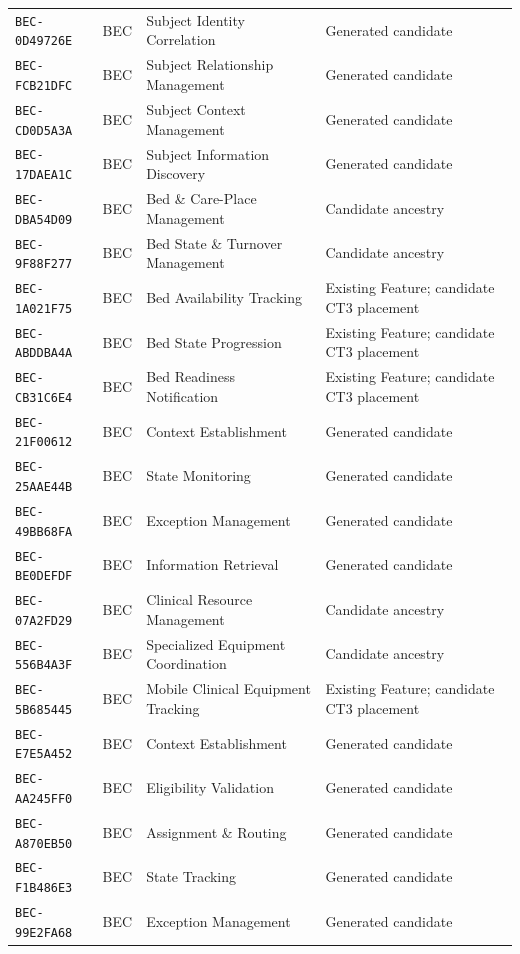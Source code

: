 \documentclass[11pt,a4paper,openany]{book}
\begin{document}
\begin{longtable}{@{}p{.19\linewidth}p{.12\linewidth}p{.39\linewidth}p{.24\linewidth}@{}}
\texttt{BEC-0D49726E} & BEC & Subject Identity Correlation & Generated candidate \\
\texttt{BEC-FCB21DFC} & BEC & Subject Relationship Management & Generated candidate \\
\texttt{BEC-CD0D5A3A} & BEC & Subject Context Management & Generated candidate \\
\texttt{BEC-17DAEA1C} & BEC & Subject Information Discovery & Generated candidate \\
\texttt{BEC-DBA54D09} & BEC & Bed \& Care-Place Management & Candidate ancestry \\
\texttt{BEC-9F88F277} & BEC & Bed State \& Turnover Management & Candidate ancestry \\
\texttt{BEC-1A021F75} & BEC & Bed Availability Tracking & Existing Feature; candidate CT3 placement \\
\texttt{BEC-ABDDBA4A} & BEC & Bed State Progression & Existing Feature; candidate CT3 placement \\
\texttt{BEC-CB31C6E4} & BEC & Bed Readiness Notification & Existing Feature; candidate CT3 placement \\
\texttt{BEC-21F00612} & BEC & Context Establishment & Generated candidate \\
\texttt{BEC-25AAE44B} & BEC & State Monitoring & Generated candidate \\
\texttt{BEC-49BB68FA} & BEC & Exception Management & Generated candidate \\
\texttt{BEC-BE0DEFDF} & BEC & Information Retrieval & Generated candidate \\
\texttt{BEC-07A2FD29} & BEC & Clinical Resource Management & Candidate ancestry \\
\texttt{BEC-556B4A3F} & BEC & Specialized Equipment Coordination & Candidate ancestry \\
\texttt{BEC-5B685445} & BEC & Mobile Clinical Equipment Tracking & Existing Feature; candidate CT3 placement \\
\texttt{BEC-E7E5A452} & BEC & Context Establishment & Generated candidate \\
\texttt{BEC-AA245FF0} & BEC & Eligibility Validation & Generated candidate \\
\texttt{BEC-A870EB50} & BEC & Assignment \& Routing & Generated candidate \\
\texttt{BEC-F1B486E3} & BEC & State Tracking & Generated candidate \\
\texttt{BEC-99E2FA68} & BEC & Exception Management & Generated candidate \\

\end{longtable}
\end{document}
